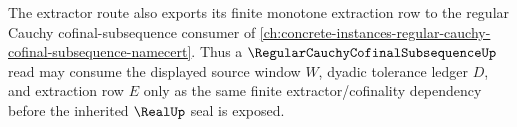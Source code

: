 The extractor route also exports its finite monotone extraction row to the regular Cauchy cofinal-subsequence consumer of \autoref{ch:concrete-instances-regular-cauchy-cofinal-subsequence-namecert}. Thus a $\RegularCauchyCofinalSubsequenceUp$ read may consume the displayed source window $W$, dyadic tolerance ledger $D$, and extraction row $E$ only as the same finite extractor/cofinality dependency before the inherited $\RealUp$ seal is exposed.
